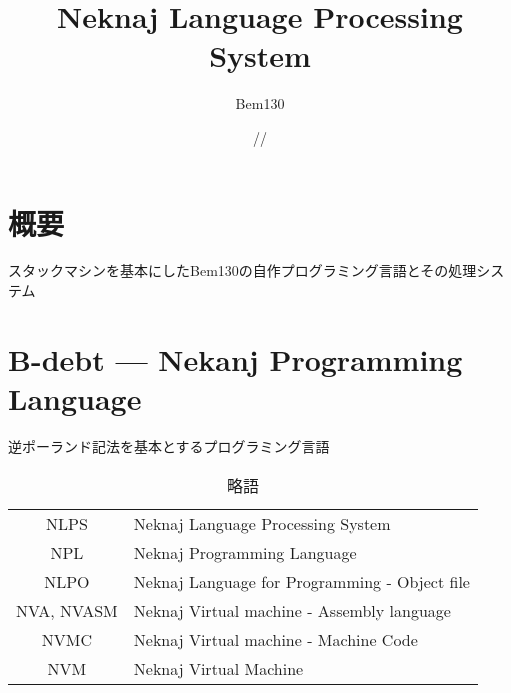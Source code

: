 \documentclass[a4paper,10.5pt]{ltjsarticle}
\begin{document}
\begin{titlepage}

\title{\Huge Neknaj Language Processing System}
\author{\LARGE Bem130}
\date{\number\year \slash \number\month \slash \number\day}

\maketitle


\tableofcontents

\end{titlepage}




\part{概要}
スタックマシンを基本にしたBem130の自作プログラミング言語とその処理システム







\part{B-debt --- Nekanj Programming Language}
逆ポーランド記法を基本とするプログラミング言語






\begin{table}[]
    \centering
    \caption{略語}
    \begin{tabular}{|c|l|}
        \hline
        NLPS & Neknaj Language Processing System\\
        NPL & Neknaj Programming Language\\
        NLPO & Neknaj Language for Programming - Object file\\
        NVA, NVASM & Neknaj Virtual machine - Assembly language\\
        NVMC & Neknaj Virtual machine - Machine Code\\
        NVM & Neknaj Virtual Machine\\
        \hline
    \end{tabular}
\end{table}
\end{document}
